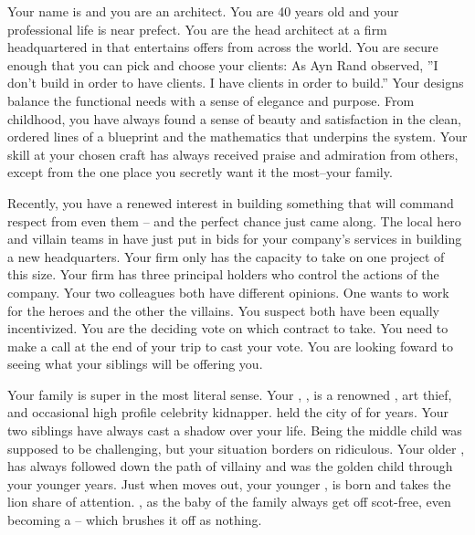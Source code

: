 \documentclass[char]{LRSguildcamp1}
\begin{document}
\name{\cArchitect{}}


Your name is \cArchitect{\intro} and you are an architect. You are 40 years old and your professional life is near prefect. You are the head architect at a firm headquartered in \pCityArchitect{} that entertains offers from across the world.  You are secure enough that you can pick and choose your clients: As Ayn Rand observed, ''I don't build in order to have clients. I have clients in order to build.'' Your designs balance the functional needs with a sense of elegance and purpose. From childhood, you have always found a sense of beauty and satisfaction in the clean, ordered lines of a blueprint and the mathematics that underpins the system. Your skill at your chosen craft has always received praise and admiration from others, except from the one place you secretly want it the most--your family. 

Recently, you have a renewed interest in building something that will command respect from even them -- and the perfect chance just came along. The local hero and villain teams in \pCityArchitect{} have just put in bids for your company's services in building a new headquarters. Your firm only has the capacity to take on one project of this size. Your firm has three principal holders who control the actions of the company. Your two colleagues both have different opinions. One wants to work for the heroes and the other the villains. You suspect both have been equally incentivized. You are the deciding vote on which contract to take. You need to make a call at the end of your trip to cast your vote. You are looking foward to seeing what your siblings will be offering you.  

Your family is super in the most literal sense. Your \cGrandma{\parent}, \cGrandma{}, is a renowned \cGrandma{\villain}, art thief, and occasional high profile celebrity kidnapper. \cGrandma{\Theyhave} held the city of \pCityGrandma{} for years. Your two siblings have always cast a shadow over your life. Being the middle child was supposed to be challenging, but your situation borders on ridiculous. Your older \cOldest{\sibling}, \cOldest{} has always followed \cGrandma{} down the path of villainy and was the golden child through your younger years. Just when \cOldest{} moves out, your younger \cYoungest{\sibling}, \cYoungest{} is born and takes the lion share of attention. \cYoungest{\They}, as the baby of the family always get off scot-free, even becoming a \cYoungest{\hero} -- which \cGrandma{} brushes it off as nothing. 
\end{document}
